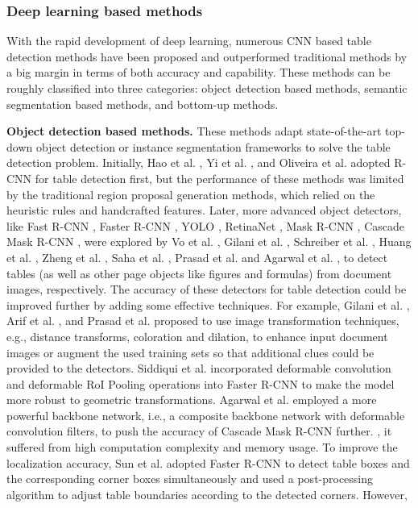 \documentclass[final,3p,times,twocolumn]{elsarticle}
\begin{document}
\subsubsection{Deep learning based methods}
With the rapid development of deep learning, numerous CNN based table detection methods have been proposed and outperformed traditional methods by a big margin in terms of both accuracy and capability. These methods can be roughly classified into three categories: object detection based methods, semantic segmentation based methods, and bottom-up methods.

\textbf{Object detection based methods.} These methods adapt state-of-the-art top-down object detection or instance segmentation frameworks to solve the table detection problem. Initially, Hao et al. \cite{hao2016table}, Yi et al. \cite{yi2017cnn}, and Oliveira et al. \cite{augusto2017fast} adopted R-CNN \cite{girshick2014rich} for table detection first, but the performance of these methods was limited by the traditional region proposal generation methods, which relied on the heuristic rules and handcrafted features. Later, more advanced object detectors, like Fast R-CNN \cite{girshick2015fast}, Faster R-CNN \cite{ren2015faster}, YOLO \cite{redmon2016you}, RetinaNet \cite{lin2017focal}, Mask R-CNN \cite{he2017mask}, Cascade Mask R-CNN \cite{cai2019cascade}, were explored by Vo et al. \cite{vo2018ensemble}, Gilani et al. \cite{gilani2017table}, Schreiber et al. \cite{schreiber2017deepdesrt}, Huang et al. \cite{huang2019yolo}, Zheng et al. \cite{zheng2021global}, Saha et al. \cite{saha2019graphical}, Prasad et al. \cite{prasad2020cascadetabnet} and Agarwal et al. \cite{agarwal2021cdec}, to detect tables (as well as other page objects like figures and formulas) from document images, respectively. The accuracy of these detectors for table detection could be improved further by adding some effective techniques. For example, Gilani et al. \cite{gilani2017table}, Arif et al. \cite{arif2018table}, and Prasad et al. \cite{prasad2020cascadetabnet} proposed to use image transformation techniques, e.g., distance transforms, coloration and dilation, to enhance input document images or augment the used training sets so that additional clues could be provided to the detectors. Siddiqui et al. \cite{siddiqui2018decnt} incorporated deformable convolution and deformable RoI Pooling operations \cite{dai2017deformable} into Faster R-CNN to make the model more robust to geometric transformations. Agarwal et al. \cite{agarwal2021cdec} employed a more powerful backbone network, i.e., a composite backbone network \cite{liu2020cbnet} with deformable convolution filters, to push the accuracy of Cascade Mask R-CNN further. {}, it suffered from high computation complexity and memory usage. To improve the localization accuracy, Sun et al. \cite{sun2019faster} adopted Faster R-CNN to detect table boxes and the corresponding corner boxes simultaneously and used a post-processing algorithm to adjust table boundaries according to the detected corners. However, 
\end{document}
